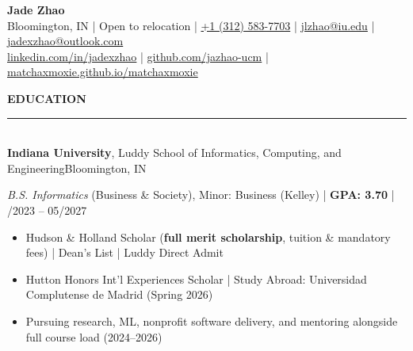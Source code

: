 \documentclass[10pt]{article}
\newcommand{\ressection}[1]{%
  \vspace{4pt plus 1pt}%
  {\bfseries\fontsize{10}{12}\selectfont\MakeUppercase{#1}}\\[-1pt]%
  \rule{\linewidth}{1pt}\\[2pt]%
}
\begin{document}
\linespread{0.97}\selectfont
\fontsize{10}{11.35}\selectfont

\begin{center}
  {\fontsize{22}{26}\selectfont\bfseries Jade Zhao}\\[3pt]
  Bloomington, IN \enspace | \enspace Open to relocation \enspace | \enspace
  \href{tel:+13125837703}{+1 (312) 583-7703} \enspace | \enspace
  \href{mailto:jlzhao@iu.edu}{jlzhao@iu.edu} \enspace | \enspace
  \href{mailto:jadexzhao@outlook.com}{jadexzhao@outlook.com}\\[2pt]
  \href{https://www.linkedin.com/in/jadexzhao}{linkedin.com/in/jadexzhao} \enspace | \enspace
  \href{https://github.com/jazhao-ucm}{github.com/jazhao-ucm} \enspace | \enspace
  \href{https://matchaxmoxie.github.io/matchaxmoxie}{matchaxmoxie.github.io/matchaxmoxie}
\end{center}

\vspace{5pt}

\ressection{Education}
\textbf{Indiana University}, Luddy School of Informatics, Computing, and Engineering\hfill Bloomington, IN\par
\textit{B.S. Informatics} (Business \& Society), Minor: Business (Kelley) \enspace | \enspace \textbf{GPA: 3.70} \enspace | /2023 -- 05/2027
\begin{itemize}
  \item Hudson \& Holland Scholar (\textbf{full merit scholarship}, tuition \& mandatory fees) \enspace | \enspace Dean's List \enspace | \enspace Luddy Direct Admit
  \item Hutton Honors Int'l Experiences Scholar \enspace | \enspace Study Abroad: Universidad Complutense de Madrid (Spring 2026)
  \item Pursuing research, ML, nonprofit software delivery, and mentoring alongside full course load (2024--2026)
\end{itemize}
\end{document}

